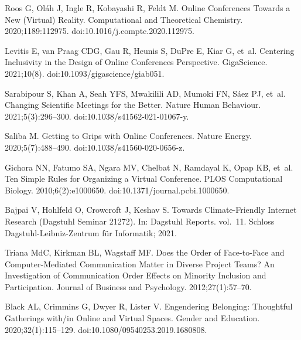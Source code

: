 \documentclass[10pt,letterpaper]{article}
\begin{document}
\begin{thebibliography}{10}
Roos G, Ol{\'a}h J, Ingle R, Kobayashi R, Feldt M.
\newblock Online Conferences \textendash{} {{Towards}} a New (Virtual) Reality.
\newblock Computational and Theoretical Chemistry. 2020;1189:112975.
\newblock doi:{10.1016/j.comptc.2020.112975}.

Levitis E, {van Praag} CDG, Gau R, Heunis S, DuPre E, Kiar G, et~al.
\newblock Centering Inclusivity in the Design of Online
  Conferences Perspective.
\newblock GigaScience. 2021;10(8).
\newblock doi:{10.1093/gigascience/giab051}.

Sarabipour S, Khan A, Seah YFS, Mwakilili AD, Mumoki FN, S{\'a}ez PJ, et~al.
\newblock Changing Scientific Meetings for the Better.
\newblock Nature Human Behaviour. 2021;5(3):296--300.
\newblock doi:{10.1038/s41562-021-01067-y}.

Saliba M.
\newblock Getting to Grips with Online Conferences.
\newblock Nature Energy. 2020;5(7):488--490.
\newblock doi:{10.1038/s41560-020-0656-z}.

Gichora NN, Fatumo SA, Ngara MV, Chelbat N, Ramdayal K, Opap KB, et~al.
\newblock Ten {{Simple Rules}} for {{Organizing}} a {{Virtual
  Conference}}.
\newblock PLOS Computational Biology. 2010;6(2):e1000650.
\newblock doi:{10.1371/journal.pcbi.1000650}.

Bajpai V, Hohlfeld O, Crowcroft J, Keshav S.
\newblock Towards Climate-Friendly Internet Research (Dagstuhl Seminar 21272).
\newblock In: Dagstuhl Reports. vol.~11. Schloss Dagstuhl-Leibniz-Zentrum
  f{\"u}r Informatik; 2021.

Triana MdC, Kirkman BL, Wagstaff MF.
\newblock Does the {{Order}} of {{Face}}-to-{{Face}} and
  {{Computer}}-{{Mediated Communication Matter}} in {{Diverse Project Teams}}?
  An {{Investigation}} of {{Communication Order Effects}} on {{Minority
  Inclusion}} and {{Participation}}.
\newblock Journal of Business and Psychology. 2012;27(1):57--70.

Black AL, Crimmins G, Dwyer R, Lister V.
\newblock Engendering Belonging: Thoughtful Gatherings with/in Online and
  Virtual Spaces.
\newblock Gender and Education. 2020;32(1):115--129.
\newblock doi:{10.1080/09540253.2019.1680808}.


\end{thebibliography}
\end{document}
